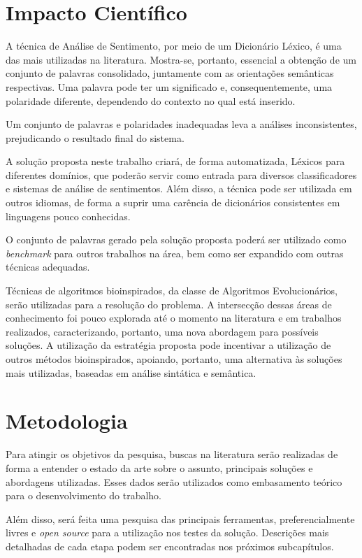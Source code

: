 \documentclass[a4paper,11pt]{article}
\begin{document}
\section{Impacto Científico}
\label{sec:impact}
A técnica de Análise de Sentimento, por meio de um Dicionário Léxico, é uma das mais utilizadas na literatura. Mostra-se, portanto, essencial a obtenção de um conjunto de palavras consolidado, juntamente com as orientações semânticas respectivas. 
Uma palavra pode ter um significado e, consequentemente, uma polaridade diferente, dependendo do contexto no qual está inserido. 

Um conjunto de palavras e polaridades inadequadas leva a análises inconsistentes, prejudicando o resultado final do sistema.

A solução proposta neste trabalho criará, de forma automatizada, Léxicos para diferentes domínios, que poderão servir como entrada para diversos classificadores e sistemas de análise de sentimentos. Além disso, a técnica pode ser utilizada em outros idiomas, de forma a suprir uma carência de dicionários consistentes em linguagens pouco conhecidas.

O conjunto de palavras gerado pela solução proposta poderá ser utilizado como \emph{benchmark} para outros trabalhos na área, bem como ser expandido com outras técnicas adequadas.

Técnicas de algoritmos bioinspirados, da classe de Algoritmos Evolucionários, serão utilizadas para a resolução do problema. A intersecção dessas áreas de conhecimento foi pouco explorada até o momento na literatura e em trabalhos realizados, caracterizando, portanto, uma nova abordagem para possíveis soluções. A utilização da estratégia proposta pode incentivar a utilização de outros métodos bioinspirados, apoiando, portanto, uma alternativa às soluções mais utilizadas, baseadas em análise sintática e semântica.

\section{Metodologia}
\label{sec:met}
Para atingir os objetivos da pesquisa, buscas na literatura serão realizadas de forma a entender o estado da arte sobre o assunto, principais soluções e abordagens utilizadas. Esses dados serão utilizados como embasamento teórico para o desenvolvimento do trabalho. 

Além disso, será feita uma pesquisa das principais ferramentas, preferencialmente livres e \emph{open source} para a utilização nos testes da solução. Descrições mais detalhadas de cada etapa podem ser encontradas nos próximos subcapítulos.
\end{document}
